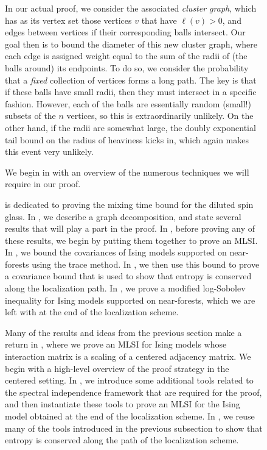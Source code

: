 \documentclass[11pt,letterpaper]{article}
\begin{document}
\begin{figure}
\medskip
In our actual proof, we consider the associated \emph{cluster graph}, which has as its vertex set those vertices $v$ that have $\ell(v) > 0$, and edges between vertices if their corresponding balls intersect. Our goal then is to bound the diameter of this new cluster graph, where each edge is assigned weight equal to the sum of the radii of (the balls around) its endpoints. To do so, we consider the probability that a \textit{fixed} collection of vertices forms a long path. The key is that if these balls have small radii, then they must intersect in a specific fashion. However, each of the balls are essentially random (small!) subsets of the $n$ vertices, so this is extraordinarily unlikely. On the other hand, if the radii are somewhat large, the doubly exponential tail bound on the radius of heaviness kicks in, which again makes this event very unlikely.

\medskip
{}
We begin in  with an overview of the numerous techniques we will require in our proof.

 is dedicated to proving the mixing time bound for the diluted spin glass. In , we describe a graph decomposition, and state several results that will play a part in the proof. In , before proving any of these results, we begin by putting them together to prove an MLSI. In , we bound the covariances of Ising models supported on near-forests using the trace method. In , we then use this bound to prove a covariance bound that is used to show that entropy is conserved along the localization path. In , we prove a modified log-Sobolev inequality for Ising models supported on near-forests, which we are left with at the end of the localization scheme.

Many of the results and ideas from the previous section make a return in , where we prove an MLSI for Ising models whose interaction matrix is a scaling of a centered adjacency matrix. We begin with a high-level overview of the proof strategy in the centered setting. In , we introduce some additional tools related to the spectral independence framework that are required for the proof, and then instantiate these tools to prove an MLSI for the Ising model obtained at the end of the localization scheme. In , we reuse many of the tools introduced in the previous subsection to show that entropy is conserved along the path of the localization scheme.


\end{figure}
\end{document}
